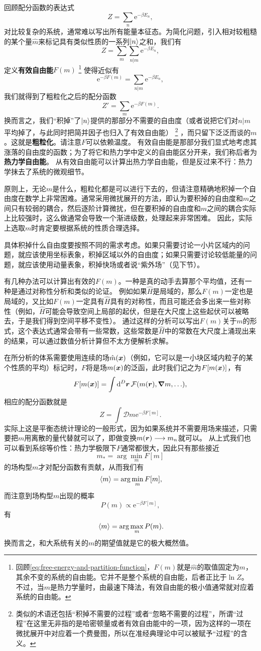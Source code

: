 \documentclass[hyperref, UTF8, a4paper]{ctexart}
\newcommand*{\ee}{\mathrm{e}}
\newcommand*{\fd}[1]{\mathcal{D}{#1}}
\begin{document}
回顾配分函数的表达式
\[
    Z = \sum_n \ee^{- \beta E_n},
\]
对比较复杂的系统，通常难以写出所有能量本征态。为简化问题，引入相对较粗糙的某个量$\hat{m}$来标记具有类似性质的一系列$\ket{n}$之和，我们有
\[
    Z = \sum_m \sum_{n|m} \ee^{- \beta E_n},
\]
定义\textbf{有效自由能}$F(m)$%
\footnote{回顾\eqref{eq:free-energy-and-partition-function}，$F(m)$就是$\hat{m}$的取值固定为$m$，其余不变的系统的自由能。它并不是整个系统的自由能，后者正比于$\ln Z$。
不过，当$m$是热力学量时，由最速下降法，有效自由能的极小值通常就对应着系统的自由能。
}%
使得近似有
\[
    \ee^{- \beta F(m)} = \sum_{n|m} \ee^{- \beta E_n},
\]
我们就得到了粗粒化之后的配分函数
\[
    Z' = \sum_m \ee^{- \beta F(m)}.
\]
换而言之，我们“积掉”了$\ket{n}$提供的那部分不需要的自由度（或者说把它们对$n|m$平均掉了，与此同时把简并因子也归入了有效自由能）%
\footnote{类似的术语还包括“积掉不需要的过程”或者“忽略不需要的过程”，所谓“过程”在这里无非指的是哈密顿量或者有效自由能中的一项，因为这样的一项在微扰展开中对应着一个费曼图，所以在准经典理论中可以被赋予“过程”的含义。}%
，而只留下泛泛而谈的$m$。这就是\textbf{粗粒化}。请注意$F$可以依赖温度。
有效自由能是那部分我们显式地考虑其涨落的自由度的函数；为了将它和热力学中定义的自由能区分开来，我们称后者为\textbf{热力学自由能}。
从有效自由能可以计算出热力学自由能，但是反过来不行：热力学抹去了系统的微观细节。

原则上，无论$m$是什么，粗粒化都是可以进行下去的，但请注意精确地积掉一个自由度在数学上非常困难。通常采用微扰展开的方法，即认为要积掉的自由度和$m$之间只有较弱的耦合，然后逐阶计算微扰，但在要积掉的自由度和$m$之间的耦合实际上比较强时，这么做通常会导致一个渐进级数，处理起来非常困难。
因此，实际上选取$m$时肯定要根据系统的性质合理选择。

具体积掉什么自由度要按照不同的需求考虑。如果只需要讨论一小片区域内的问题，就应该使用坐标表象，积掉区域以外的自由度；如果只需要讨论较低能量的问题，就应该使用动量表象，积掉快场或者说“紫外场”（见下节）。

有几种办法可以计算出有效的$F(m)$。一种是真的动手去算那个平均值，还有一种是通过对称性分析和类似的论证。
例如如果$\hat{H}$是局域的，那么$F(m)$一定也是局域的，又比如$F(m)$一定具有$\hat{H}$具有的对称性，而且可能还会多出来一些对称性（例如，$\hat{H}$可能会导致空间上局部的起伏，但是在大尺度上这些起伏可以被略去，于是我们得到空间平移不变性）。
通过这样的分析可以写出$F(m)$关于$m$的形式，这个表达式通常会带有一些常数，这些常数是$\hat{H}$中的常数在大尺度上涌现出来的结果，可以通过数值分析计算但不太方便解析求解。

在所分析的体系需要使用连续的场$\hat{m}(\vb*{x})$（例如，它可以是一小块区域内粒子的某个性质的平均）标记时，$F$将是场$m(\vb*{x})$的泛函，此时我们记之为$F[m(\vb*{x})]$，有
\[
    F[m(\vb*{x})] = \int \dd[D]{\vb*{r}} \mathcal{F}(m(\vb*{r}), \grad{m}, \ldots), 
\]
相应的配分函数就是
\[
    Z = \int \fd{m} \ee^{- \beta F[m]}.
\]
实际上这是平衡态统计理论的一般形式，因为如果系统并不需要用场来描述，只需要把$m$用离散的量代替就可以了，即做变换$m(\vb*{r}) \longrightarrow m_n$就可以。
从上式我们也可以看到系综等价性：热力学极限下$F$通常都很大，因此只有那些接近
\[
    m_* = \arg\min_m F[m]
\]
的场构型$m$才对配分函数有贡献，从而我们有
\[
    \expval*{m} = \arg\min_m F[m],
\]
而注意到场构型$m$出现的概率
\[
    P(m) \propto \ee^{-\beta F[m]},
\]
有
\[
    \expval*{m} = \arg\max_m P(m).
\]
换而言之，和大系统有关的$m$的期望值就是它的极大概然值。
\end{document}
